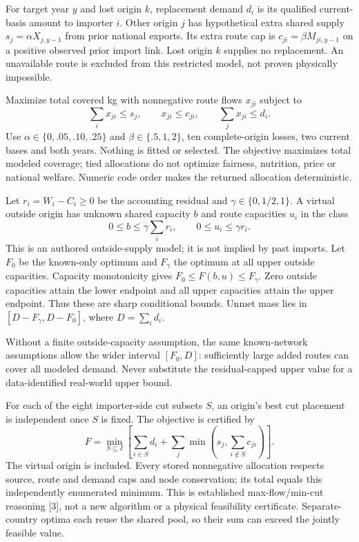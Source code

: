 \documentclass[11pt,letterpaper]{article}
\newcommand{\heading}[1]{\vspace{4pt}{\large\bfseries #1}\par}
\begin{document}
\newpage
\heading{Known-network model and authored parameter grid}
For target year $y$ and lost origin $k$, replacement demand $d_i$ is its qualified current-basis amount to importer $i$. Other origin $j$ has hypothetical extra shared supply $s_j=\alpha X_{j,y-1}$ from prior national exports. Its extra route cap is $c_{ji}=\beta M_{ji,y-1}$ on a positive observed prior import link. Lost origin $k$ supplies no replacement. An unavailable route is excluded from this restricted model, not proven physically impossible.

Maximize total covered kg with nonnegative route flows $x_{ji}$ subject to
\[
 \sum_i x_{ji}\le s_j,\qquad x_{ji}\le c_{ji},\qquad
 \sum_j x_{ji}\le d_i.
\]
Use $\alpha\in\{0,.05,.10,.25\}$ and $\beta\in\{.5,1,2\}$, ten complete-origin losses, two current bases and both years. Nothing is fitted or selected. The objective maximizes total modeled coverage; tied allocations do not optimize fairness, nutrition, price or national welfare. Numeric code order makes the returned allocation deterministic.

\heading{Conditional uncertainty class and sharp endpoint bounds}
Let $r_i=W_i-C_i\ge0$ be the accounting residual and $\gamma\in\{0,1/2,1\}$. A virtual outside origin has unknown shared capacity $b$ and route capacities $u_i$ in the class
\[
 0\le b\le\gamma\sum_i r_i,\qquad 0\le u_i\le\gamma r_i.
\]
This is an authored outside-supply model; it is not implied by past imports. Let $F_0$ be the known-only optimum and $F_\gamma$ the optimum at all upper outside capacities. Capacity monotonicity gives $F_0\le F(b,u)\le F_\gamma$. Zero outside capacities attain the lower endpoint and all upper capacities attain the upper endpoint. Thus these are sharp conditional bounds. Unmet mass lies in $[D-F_\gamma,D-F_0]$, where $D=\sum_i d_i$.

Without a finite outside-capacity assumption, the same known-network assumptions allow the wider interval $[F_0,D]$: sufficiently large added routes can cover all modeled demand. Never substitute the residual-capped upper value for a data-identified real-world upper bound.

\heading{Independent finite optimality certificate}
For each of the eight importer-side cut subsets $S$, an origin's best cut placement is independent once $S$ is fixed. The objective is certified by
\[
 F=\min_{S\subseteq I}\left[\sum_{i\in S}d_i+
 \sum_j\min\left(s_j,\sum_{i\notin S}c_{ji}\right)\right].
\]
The virtual origin is included. Every stored nonnegative allocation respects source, route and demand caps and node conservation; its total equals this independently enumerated minimum. This is established max-flow/min-cut reasoning [3], not a new algorithm or a physical feasibility certificate. Separate-country optima each reuse the shared pool, so their sum can exceed the jointly feasible value.
\end{document}
